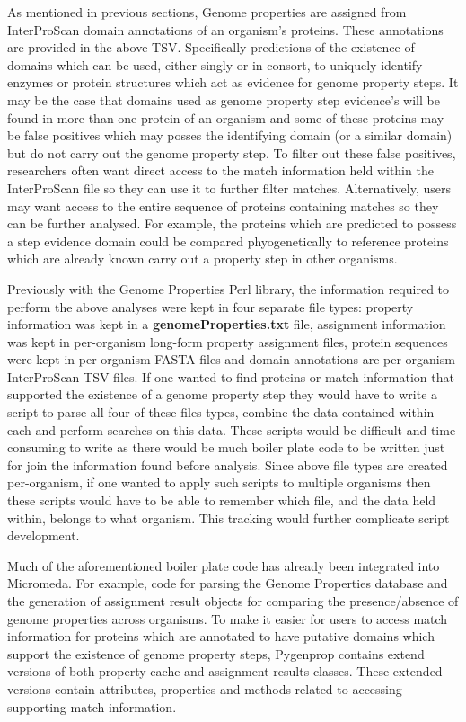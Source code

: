 As mentioned in previous sections, Genome properties are assigned from InterProScan domain annotations of an organism's proteins. These annotations are provided in the above TSV. Specifically predictions of the existence of domains which can be used, either singly or in consort, to uniquely identify enzymes or protein structures which act as evidence for genome property steps. It may be the case that domains used as genome property step evidence's will be found in more than one protein of an organism and some of these proteins may be false positives which may posses the identifying domain (or a similar domain) but do not carry out the genome property step. To filter out these false positives, researchers often want direct access to the match information held within the InterProScan file so they can use it to further filter matches. Alternatively, users may want access to the entire sequence of proteins containing matches so they can be further analysed. For example, the proteins which are predicted to possess a step evidence domain could be compared phyogenetically to reference proteins which are already known carry out a property step in other organisms.

Previously with the Genome Properties Perl library, the information required to perform the above analyses were kept in four separate file types: property information was kept in a \textbf{genomeProperties.txt} file, assignment information was kept in per-organism long-form property assignment files, protein sequences were kept in per-organism FASTA files and domain annotations are per-organism InterProScan TSV files. If one wanted to find proteins or match information that supported the existence of a genome property step they would have to write a script to parse all four of these files types, combine the data contained within each and perform searches on this data. These scripts would be difficult and time consuming to write as there would be much boiler plate code to be written just for join the information found before analysis. Since above file types are created per-organism, if one wanted to apply such scripts to multiple organisms then these scripts would have to be able to remember which file, and the data held within, belongs to what organism. This tracking would further complicate script development.

Much of the aforementioned boiler plate code has already been integrated into Micromeda. For example, code for parsing the Genome Properties database and the generation of assignment result objects for comparing the presence/absence of genome properties across organisms. To make it easier for users to access match information for proteins which are annotated to have putative domains which support the existence of genome property steps, Pygenprop contains extend versions of both property cache and assignment results classes. These extended versions contain attributes, properties and methods related to accessing supporting match information.

